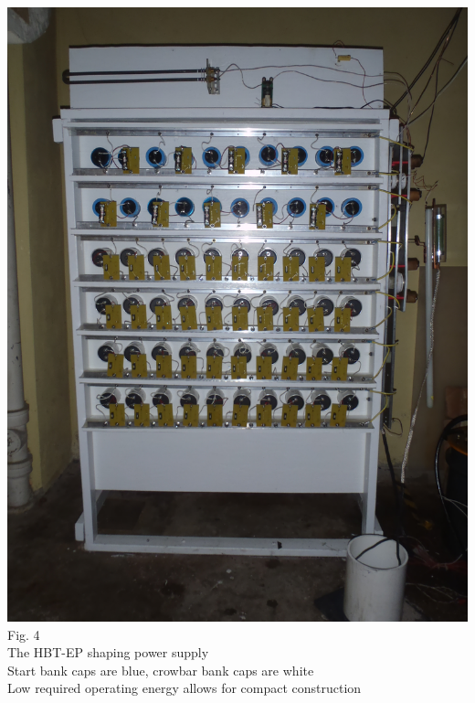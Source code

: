 \documentclass{article}
\begin{document}
\begin{multicols}{5}
\begin{itemize}
\vspace{.25in}
\begin{center}
\includegraphics[width=0.8\columnwidth]{Cap_bank.jpg}\\
Fig. 4\\
The HBT-EP shaping power supply\\
Start bank caps are blue, crowbar bank caps are white\\
Low required operating energy allows for compact construction\\
\vspace{.25in}
\end{center}

\end{itemize}
\end{multicols}
\end{document}
